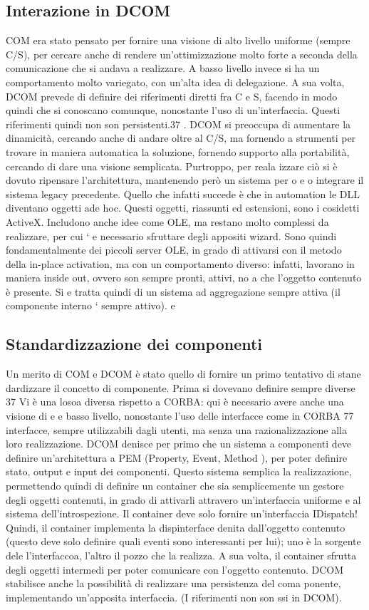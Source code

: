\documentclass[a4paper,12pt]{article}
\begin{document}
\subsection{Interazione in DCOM}
COM era stato pensato per fornire una visione di alto livello uniforme (sempre
C/S), per cercare anche di rendere un'ottimizzazione molto forte a seconda
della comunicazione che si andava a realizzare. A basso livello invece si ha un
comportamento molto variegato, con un'alta idea di delegazione.
A sua volta, DCOM prevede di definire dei riferimenti diretti fra C e S,
facendo in modo quindi che si conoscano comunque, nonostante l'uso di un'interfaccia. Questi riferimenti quindi non son
persistenti.37 . DCOM si preoccupa
di aumentare la dinamicità, cercando anche di andare oltre al C/S, ma fornendo
a
strumenti per trovare in maniera automatica la soluzione, fornendo supporto
alla portabilità, cercando di dare una visione semplicata. Purtroppo, per reala
izzare ciò si è dovuto ripensare l'architettura, mantenendo però un sistema per
o e
o
integrare il sistema legacy precedente.
Quello che infatti succede è che in automation le DLL diventano oggetti ade
hoc. Questi oggetti, riassunti ed estensioni, sono i cosidetti ActiveX. Includono
anche idee come OLE, ma restano molto complessi da realizzare, per cui `
e
necessario sfruttare degli appositi wizard. Sono quindi fondamentalmente dei
piccoli server OLE, in grado di attivarsi con il metodo della in-place activation,
ma con un comportamento diverso: infatti, lavorano in maniera inside out,
ovvero son sempre pronti, attivi, no a che l'oggetto contenuto è presente. Si
e
tratta quindi di un sistema ad aggregazione sempre attiva (il componente interno
` sempre attivo).
e
\subsection{Standardizzazione dei componenti}
Un merito di COM e DCOM è stato quello di fornire un primo tentativo di stane
dardizzare il concetto di componente. Prima si dovevano definire sempre diverse
37 Vi è una losoa diversa rispetto a CORBA: qui è necesario avere anche una visione di
e
e
basso livello, nonostante l'uso delle interfacce come in CORBA
77
interfacce, sempre utilizzabili dagli utenti, ma senza una razionalizzazione alla
loro realizzazione.
DCOM denisce per primo che un sistema a componenti deve definire un'architettura a PEM (Property, Event, Method ), per
poter definire stato, output
e input dei componenti. Questo sistema semplica la realizzazione, permettendo quindi di definire un container che sia
semplicemente un gestore degli oggetti
contenuti, in grado di attivarli attravero un'interfaccia uniforme e al sistema dell'introspezione. Il container deve
solo fornire un'interfaccia IDispatch! Quindi,
il container implementa la dispinterface denita dall'oggetto contenuto (questo
deve solo definire quali eventi sono interessanti per lui); uno è la sorgente dele
l'interfaccoa, l'altro il pozzo che la realizza. A sua volta, il container sfrutta
degli oggetti intermedi per poter comunicare con l'oggetto contenuto.
DCOM stabilisce anche la possibilità di realizzare una persistenza del coma
ponente, implementando un'apposita interfaccia. (I riferimenti non son ssi in
DCOM).
\end{document}
